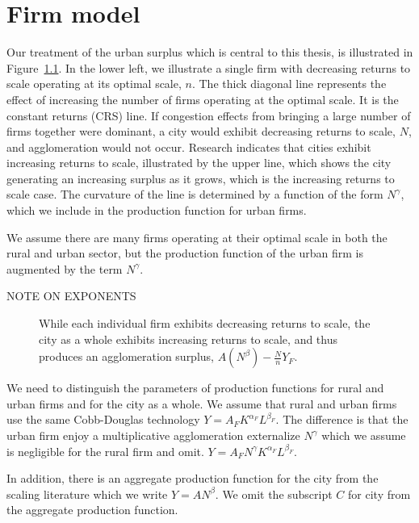 \chapter{Firm model}
Our treatment of the urban surplus which is central to this thesis, is illustrated in Figure~\ref{fig:Agglomeration-surplus}. In the lower left, we illustrate a single firm with decreasing returns to scale operating at its optimal scale, $n$. The thick diagonal line represents the effect of increasing the number of firms operating at the optimal scale. It is the constant returns (CRS) line. If congestion effects from bringing a large number of firms together were dominant, a city would exhibit decreasing returns to  scale,  $N$, and agglomeration would not occur. Research indicates that cities exhibit increasing returns to scale, illustrated by the upper line, which shows the city generating an increasing surplus as it grows, which is the increasing returns to scale case. The curvature of the line is determined by a function of the form $N^\gamma$, which we include in the production function for urban firms. 

We assume there are many firms operating at their optimal scale in both the rural and urban sector, but the production function of the urban firm is augmented by the term $N^\gamma$. 

NOTE ON EXPONENTS

\begin{figure}[htb]
    \centering

    \caption{While each individual firm exhibits decreasing returns to scale, the city as a whole exhibits increasing returns to scale, and thus produces an agglomeration surplus, $A(N^\beta)-\frac{N}{n}Y_F$.}
    \label{fig:Agglomeration-surplus}
\end{figure}

We need to distinguish the parameters of production functions for rural and urban firms and for the city as a whole. We assume that  rural and  urban firms use the same Cobb-Douglas technology $Y=A_FK^{\alpha_F}L^{\beta_F}$. The difference is that the urban firm enjoy a  multiplicative agglomeration externalize $N^\gamma$ which we assume is negligible for the rural firm and omit. $Y=A_FN^\gamma  K^{\alpha_F}L^{\beta_F}$.

In addition, there is an aggregate production function for the city from the scaling literature which we write $Y=AN^\beta$. We omit the subscript $C$ for city from  the aggregate production function.    



